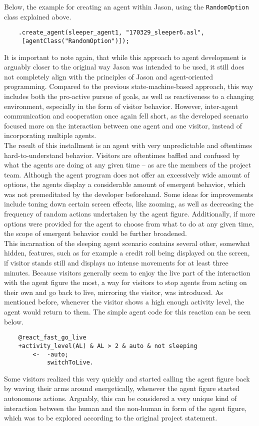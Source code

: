 \documentclass[draft,final]{vutinfth} %
\begin{document}
Below, the example for creating an agent within Jason, using the \verb|RandomOption| class explained above.
\begin{verbatim}
    .create_agent(sleeper_agent1, "170329_sleeper6.asl",
     [agentClass("RandomOption")]);
\end{verbatim}
It is important to note again, that while this approach to agent development is arguably closer to the original way Jason was intended to be used, it still does not completely align with the principles of Jason and agent-oriented programming. 
Compared to the previous state-machine-based approach, this way includes both the pro-active pursue of goals, as well as reactiveness to a changing environment, especially in the form of visitor behavior.
However, inter-agent communication and cooperation once again fell short, as the developed scenario focused more on the interaction between one agent and one visitor, instead of incorporating multiple agents. \\
The result of this installment is an agent with very unpredictable and oftentimes hard-to-understand behavior. 
Visitors are oftentimes baffled and confused by what the agents are doing at any given time – as are the members of the project team. 
Although the agent program does not offer an excessively wide amount of options, the agents display a considerable amount of emergent behavior, which was not premeditated by the developer beforehand. 
Some ideas for improvements include toning down certain screen effects, like zooming, as well as decreasing the frequency of random actions undertaken by the agent figure. 
Additionally, if more options were provided for the agent to choose from what to do at any given time, the scope of emergent behavior could be further broadened. \\
This incarnation of the sleeping agent scenario contains several other, somewhat hidden, features, such as for example a credit roll being displayed on the screen, if visitor stands still and displays no intense movements for at least three minutes. 
Because visitors generally seem to enjoy the live part of the interaction with the agent figure the most, a way for visitors to stop agents from acting on their own and go back to live, mirroring the visitor, was introduced. 
As mentioned before, whenever the visitor shows a high enough activity level, the agent would return to them. 
The simple agent code for this reaction can be seen below.
\begin{verbatim}
    @react_fast_go_live
    +activity_level(AL) & AL > 2 & auto & not sleeping
        <-  -auto;
            switchToLive.
\end{verbatim}
Some visitors realized this very quickly and started calling the agent figure back by waving their arms around energetically, whenever the agent figure started autonomous actions. 
Arguably, this can be considered a very unique kind of interaction between the human and the non-human in form of the agent figure, which was to be explored according to the original project statement. 
\end{document}
